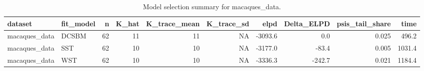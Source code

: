 \begin{table}

\caption{\label{tab:tab:model_selection_macaques_data}Model selection summary for macaques_data.}
\centering
\begin{tabular}[t]{llrrrrrrrr}
\toprule
dataset & fit\_model & n & K\_hat & K\_trace\_mean & K\_trace\_sd & elpd & Delta\_ELPD & psis\_tail\_share & time\\
\midrule
macaques\_data & DCSBM & 62 & 11 & 11 & NA & -3093.6 & 0.0 & 0.025 & 496.2\\
macaques\_data & SST & 62 & 10 & 10 & NA & -3177.0 & -83.4 & 0.005 & 1031.4\\
macaques\_data & WST & 62 & 10 & 10 & NA & -3336.3 & -242.7 & 0.021 & 1184.4\\
\bottomrule
\end{tabular}
\end{table}
